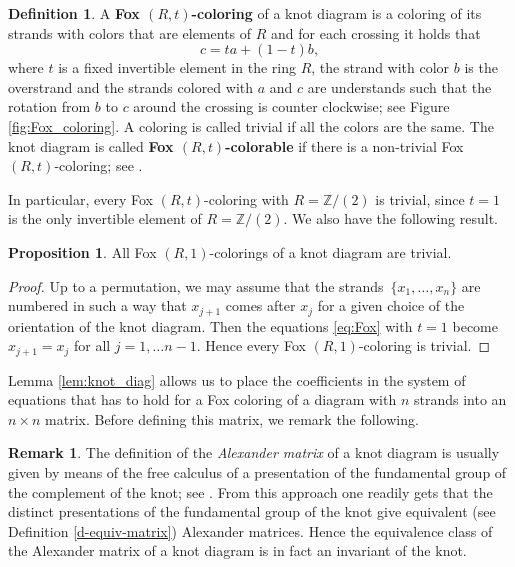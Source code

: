 \documentclass[11pt,a4paper]{article}
\theoremstyle{definition}
\newtheorem{proposition}[theorem]{Proposition}
\newtheorem{definition}[theorem]{Definition}
\newtheorem{remark}[theorem]{Remark}
\newcommand{\numberset}{\mathbb}
\newcommand{\Z}{\numberset{Z}}
\begin{document}
\begin{definition}
\label{def:FoxRt}
A \textbf{Fox $(R,t)$-coloring} of a knot diagram is a coloring of its strands with colors that are elements of $R$ and for each crossing it holds that
\begin{equation}
\label{eq:Fox}
c=ta +(1-t)b,
\end{equation}
where $t$ is a fixed invertible element in the ring $R$, the strand with color $b$ is the overstrand and the strands colored with $a$ and $c$ are understands such that the rotation from $b$ to $c$ around the crossing is counter clockwise; see Figure \ref{fig:Fox_coloring}.
A coloring is called trivial if all the colors are the same. The knot diagram is called \textbf{Fox $(R,t)$-colorable} if there is a non-trivial Fox $(R,t)$-coloring; see \cite{fox1970}.
\end{definition}

In particular, every Fox $(R,t)$-coloring with $R=\Z/(2)$ is trivial, since $t=1$ is the only invertible element of $R=\Z/(2)$. We also have the following result.


\begin{proposition}\label{p-(R,1)-col}
All Fox $(R,1)$-colorings of a knot diagram are trivial.
\end{proposition}

\begin{proof}
Up to a permutation, we may assume that the strands~$\{x_1,\ldots,x_n\}$ are numbered in such a way that $x_{j+1}$ comes after $x_j$ for a given choice of the orientation of the knot diagram.
Then the equations \eqref{eq:Fox} with $t=1$ become $x_{j+1}=x_j$ for all $j=1, \ldots n-1$. Hence every Fox $(R,1)$-coloring is trivial.
\end{proof}

Lemma \ref{lem:knot_diag} allows us to place the coefficients in the system of equations that has to hold for a Fox coloring of a diagram with $n$ strands into an $n \times n$ matrix. Before defining this matrix, we remark the following.

\begin{remark}\label{r-alex}
The definition of the \textit{Alexander matrix} of a knot diagram is usually given by means of the free calculus of a presentation of the fundamental group of the complement of the knot; see \cite[Chapter III]{crowell2012introduction}. From this approach one readily gets that the distinct presentations of the fundamental group of the knot give equivalent (see Definition \ref{d-equiv-matrix}) Alexander matrices. Hence the equivalence class of the Alexander matrix of a knot diagram is in fact an invariant of the knot.
\end{remark}
\end{document}
